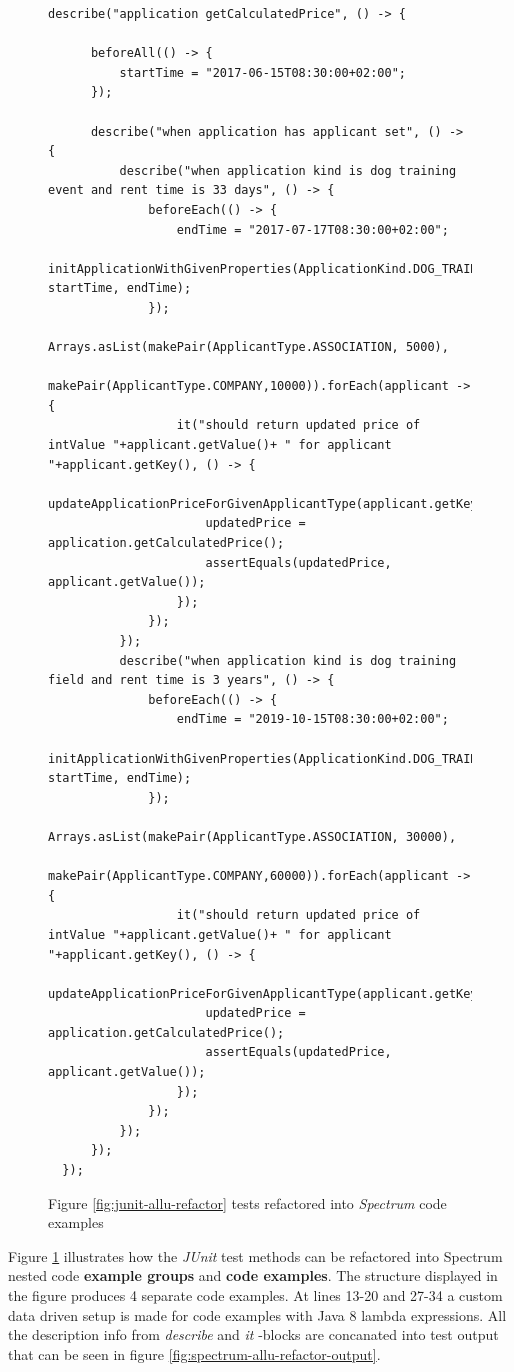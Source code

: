     \begin{figure}[H]
        \begin{lstlisting}[style=java]
  describe("application getCalculatedPrice", () -> {

      beforeAll(() -> {
          startTime = "2017-06-15T08:30:00+02:00";
      });

      describe("when application has applicant set", () -> {
          describe("when application kind is dog training event and rent time is 33 days", () -> {
              beforeEach(() -> {
                  endTime = "2017-07-17T08:30:00+02:00";
                  initApplicationWithGivenProperties(ApplicationKind.DOG_TRAINING_EVENT, startTime, endTime);
              });
              Arrays.asList(makePair(ApplicantType.ASSOCIATION, 5000),
                      makePair(ApplicantType.COMPANY,10000)).forEach(applicant -> {
                  it("should return updated price of intValue "+applicant.getValue()+ " for applicant "+applicant.getKey(), () -> {
                      updateApplicationPriceForGivenApplicantType(applicant.getKey());
                      updatedPrice = application.getCalculatedPrice();
                      assertEquals(updatedPrice, applicant.getValue());
                  });
              });
          });
          describe("when application kind is dog training field and rent time is 3 years", () -> {
              beforeEach(() -> {
                  endTime = "2019-10-15T08:30:00+02:00";
                  initApplicationWithGivenProperties(ApplicationKind.DOG_TRAINING_FIELD, startTime, endTime);
              });
              Arrays.asList(makePair(ApplicantType.ASSOCIATION, 30000),
                            makePair(ApplicantType.COMPANY,60000)).forEach(applicant -> {
                  it("should return updated price of intValue "+applicant.getValue()+ " for applicant "+applicant.getKey(), () -> {
                      updateApplicationPriceForGivenApplicantType(applicant.getKey());
                      updatedPrice = application.getCalculatedPrice();
                      assertEquals(updatedPrice, applicant.getValue());
                  });
              });
          });
      });
  });
        \end{lstlisting}
        \caption{Figure \ref{fig:junit-allu-refactor} tests refactored into \textit{Spectrum} code examples}
        \label{fig:spectrum-allu-refactor}
    \end{figure}
    \restoregeometry

    Figure \ref{fig:spectrum-allu-refactor} illustrates how the \textit{JUnit} test methods can be refactored into Spectrum
    nested code \textbf{example groups} and \textbf{code examples}. The structure displayed in the figure produces 4 separate
    code examples. At lines 13-20 and 27-34 a custom data driven setup is made for code examples with Java 8 lambda expressions.
    All the description info from \textit{describe} and \textit{it} -blocks are concanated into test output
    that can be seen in figure \ref{fig:spectrum-allu-refactor-output}.

